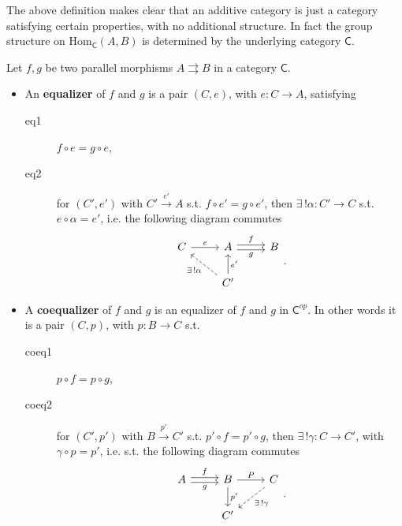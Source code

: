 \documentclass[../Main]{subfiles}
\begin{document}
\begin{rem}[]
	The above definition makes clear that an additive category is
	just a category satisfying certain properties,
	with no additional structure.
	In fact the group structure on $\mathrm{Hom}_{\mathsf{C}} \left( A, B \right)$
	is determined by the underlying category $\mathsf{C}$.
\end{rem}

\begin{defn}[(Co)equalizer]
	Let $f,g$ be two parallel morphisms $A \rightrightarrows B$ in a category $\mathsf{C}$.
	\begin{itemize}
		\item An \textbf{equalizer} of $f$ and $g$ is a pair $\left(C, e\right)$,
			with $e\colon C \to A$, satisfying
	\begin{description}
		\item[eq1] $f \circ e = g \circ e$,
		\item[eq2] for $\left(C', e'\right)$ with $C' \xrightarrow{e'} A$ s.t. $f \circ e' = g \circ e'$, then
			$\exists\, ! \alpha: C' \to C$ s.t. $e \circ \alpha = e'$, i.e. the following diagram commutes
			\begin{equation}
			\begin{tikzcd}
				C \arrow[r, "e", rightarrow] & A \arrow[r, "f", rightarrow, shift left=.5ex] \arrow[r, "g"', rightarrow, shift right=.5ex] & B\\
				    & C' \arrow[lu, "\exists\, ! \alpha", dashrightarrow] \arrow[u, "e'"', rightarrow] & 
			\end{tikzcd}
			.\end{equation} 
	\end{description}
	\item A \textbf{coequalizer} of $f$ and $g$ is an equalizer of $f$ and $g$ in $\mathsf{C}^{op}$.
		In other words it is a pair $\left(C, p\right)$, 
		with $p\colon B \to C$ s.t.
		\begin{description}
			\item[coeq1] $p \circ f = p \circ g$,
			\item[coeq2] for $\left(C', p'\right)$ with $B \xrightarrow{p'} C'$ s.t. $p' \circ f = p' \circ g$, then $\exists\, ! \gamma: C \to C'$, with $\gamma \circ p = p'$, i.e. s.t. the following diagram commutes
			\begin{equation}
			\begin{tikzcd}
				A \arrow[r, "f", rightarrow, shift left=.5ex] \arrow[r, "g"', rightarrow, shift right=.5ex] & B \arrow[r, "P", rightarrow] \arrow[d, "p'", rightarrow] & C \arrow[dl, "\exists\, ! \gamma", dashrightarrow] \\
				    & C' & 
			\end{tikzcd}
			.\end{equation} 
		\end{description} 
	\end{itemize}
\end{defn}
\end{document}
